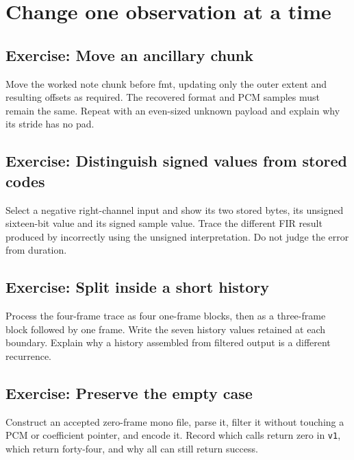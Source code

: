 \section{Change one observation at a time}
\subsection*{Exercise: Move an ancillary chunk}
Move the worked note chunk before fmt, updating only the outer extent and resulting
offsets as required. The recovered format and PCM samples must remain the same.
Repeat with an even-sized unknown payload and explain why its stride has no pad.

\subsection*{Exercise: Distinguish signed values from stored codes}
Select a negative right-channel input and show its two stored bytes, its unsigned
sixteen-bit value and its signed sample value. Trace the different FIR result produced
by incorrectly using the unsigned interpretation. Do not judge the error from duration.

\subsection*{Exercise: Split inside a short history}
Process the four-frame trace as four one-frame blocks, then as a three-frame block
followed by one frame. Write the seven history values retained at each boundary.
Explain why a history assembled from filtered output is a different recurrence.

\subsection*{Exercise: Preserve the empty case}
Construct an accepted zero-frame mono file, parse it, filter it without touching a
PCM or coefficient pointer, and encode it. Record which calls return zero in
\texttt{v1}, which return forty-four, and why all can still return success.
